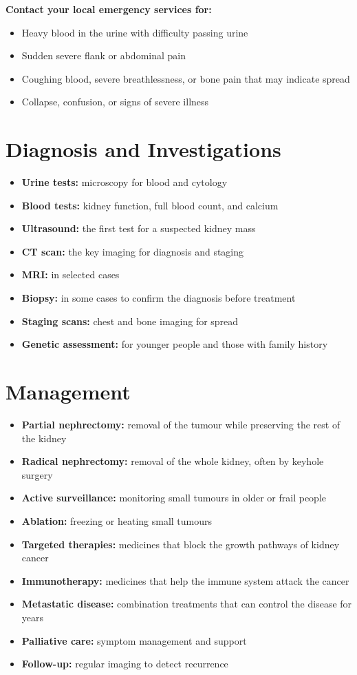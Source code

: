 \textbf{Contact your local emergency services for:}
\begin{itemize}
    \item Heavy blood in the urine with difficulty passing urine
    \item Sudden severe flank or abdominal pain
    \item Coughing blood, severe breathlessness, or bone pain that may indicate spread
    \item Collapse, confusion, or signs of severe illness
\end{itemize}

\section*{Diagnosis and Investigations}
\begin{itemize}
    \item \textbf{Urine tests:} microscopy for blood and cytology
    \item \textbf{Blood tests:} kidney function, full blood count, and calcium
    \item \textbf{Ultrasound:} the first test for a suspected kidney mass
    \item \textbf{CT scan:} the key imaging for diagnosis and staging
    \item \textbf{MRI:} in selected cases
    \item \textbf{Biopsy:} in some cases to confirm the diagnosis before treatment
    \item \textbf{Staging scans:} chest and bone imaging for spread
    \item \textbf{Genetic assessment:} for younger people and those with family history
\end{itemize}

\section*{Management}
\begin{itemize}
    \item \textbf{Partial nephrectomy:} removal of the tumour while preserving the rest of the kidney
    \item \textbf{Radical nephrectomy:} removal of the whole kidney, often by keyhole surgery
    \item \textbf{Active surveillance:} monitoring small tumours in older or frail people
    \item \textbf{Ablation:} freezing or heating small tumours
    \item \textbf{Targeted therapies:} medicines that block the growth pathways of kidney cancer
    \item \textbf{Immunotherapy:} medicines that help the immune system attack the cancer
    \item \textbf{Metastatic disease:} combination treatments that can control the disease for years
    \item \textbf{Palliative care:} symptom management and support
    \item \textbf{Follow-up:} regular imaging to detect recurrence
\end{itemize}

